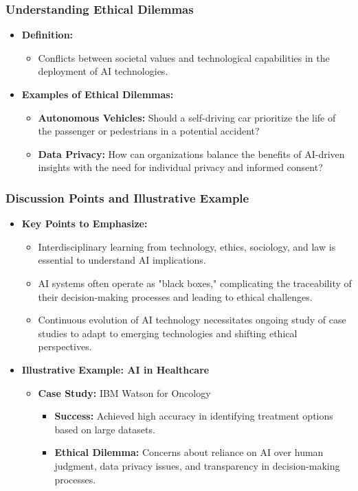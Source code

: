 \documentclass[aspectratio=169]{beamer}
\begin{document}
\begin{frame}[fragile]
    \frametitle{Understanding Ethical Dilemmas}
    \begin{itemize}
        \item \textbf{Definition:} 
            \begin{itemize}
                \item Conflicts between societal values and technological capabilities in the deployment of AI technologies.
            \end{itemize}
        \item \textbf{Examples of Ethical Dilemmas:}
            \begin{itemize}
                \item \textbf{Autonomous Vehicles:} Should a self-driving car prioritize the life of the passenger or pedestrians in a potential accident?
                \item \textbf{Data Privacy:} How can organizations balance the benefits of AI-driven insights with the need for individual privacy and informed consent?
            \end{itemize}
    \end{itemize}
\end{frame}

\begin{frame}[fragile]
    \frametitle{Discussion Points and Illustrative Example}
    \begin{itemize}
        \item \textbf{Key Points to Emphasize:}
            \begin{itemize}
                \item Interdisciplinary learning from technology, ethics, sociology, and law is essential to understand AI implications.
                \item AI systems often operate as "black boxes," complicating the traceability of their decision-making processes and leading to ethical challenges.
                \item Continuous evolution of AI technology necessitates ongoing study of case studies to adapt to emerging technologies and shifting ethical perspectives.
            \end{itemize}
        \item \textbf{Illustrative Example: AI in Healthcare}
            \begin{itemize}
                \item \textbf{Case Study:} IBM Watson for Oncology
                    \begin{itemize}
                        \item \textbf{Success:} Achieved high accuracy in identifying treatment options based on large datasets.
                        \item \textbf{Ethical Dilemma:} Concerns about reliance on AI over human judgment, data privacy issues, and transparency in decision-making processes.
                    \end{itemize}
            \end{itemize}
    \end{itemize}
\end{frame}
\end{document}

